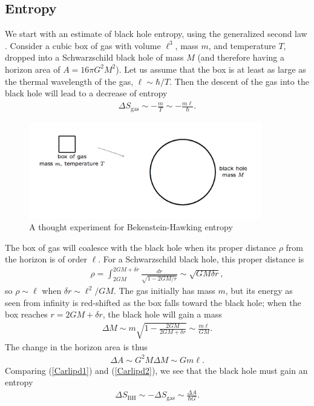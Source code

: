 \documentclass[12pt]{article}
\begin{document}
\subsection{Entropy \label{Enta}}
We start with an estimate of black hole entropy, using the generalized
second law \cite{Kiefer}.  Consider a cubic box of gas with volume
$\ell^3$, mass $m$, and temperature $T$, dropped into a Schwarzschild 
black hole of mass $M$ (and therefore having a horizon area of
$A = 16\pi G^2M^2$).  Let us assume that the box is at least as large 
as the thermal wavelength of the gas, $\ell\sim \hbar/T$.  Then the 
descent of the gas into the black hole will lead to a decrease of entropy
\begin{align}
\Delta S_{\mathrm{\scriptstyle gas}} \sim -\frac{m}{T} \sim -\frac{m\ell}{\hbar} .
\label{Carlipd1}
\end{align}
\begin{figure}
\centerline{\includegraphics[width=4in]{fig1b.pdf}}
\caption{A thought experiment for Bekenstein-Hawking entropy}
\label{Carlipfig1}
\end{figure}

The box of gas will coalesce with the black hole when its proper
distance $\rho$ from the horizon is of order $\ell$.  For a Schwarzschild 
black hole, this proper distance is
\begin{align*}
\rho = \int_{2GM}^{2GM + \delta r} \frac{dr}{\sqrt{1- 2GM/r}}
 \sim \sqrt{GM\delta r}  ,
\end{align*}
so $\rho \sim \ell$ when $\delta r \sim \ell^2/GM$.  The gas initially 
has mass $m$, but its energy as seen from infinity is red-shifted 
as the box falls toward the black hole; when the box reaches 
$r = 2GM + \delta r$, the black hole will gain a mass 
\begin{align*}
\Delta M \sim m \sqrt{1 - \frac{2GM}{2GM + \delta r}} 
 \sim \frac{m\ell}{GM}  .
\end{align*}
The change in the horizon area is thus
\begin{align}
\Delta A \sim G^2M\Delta M \sim Gm\ell  .
\label{Carlipd2}
\end{align}
Comparing (\ref{Carlipd1}) and (\ref{Carlipd2}), we see that the black hole
must gain an entropy
\begin{align}
\Delta S_{\scriptscriptstyle\mathrm{BH}} \sim -\Delta S_{\mathrm{\scriptstyle gas}}
\sim \frac{\Delta A}{\hbar G}   .
\label{Carlipd3}
\end{align}
\end{document}
